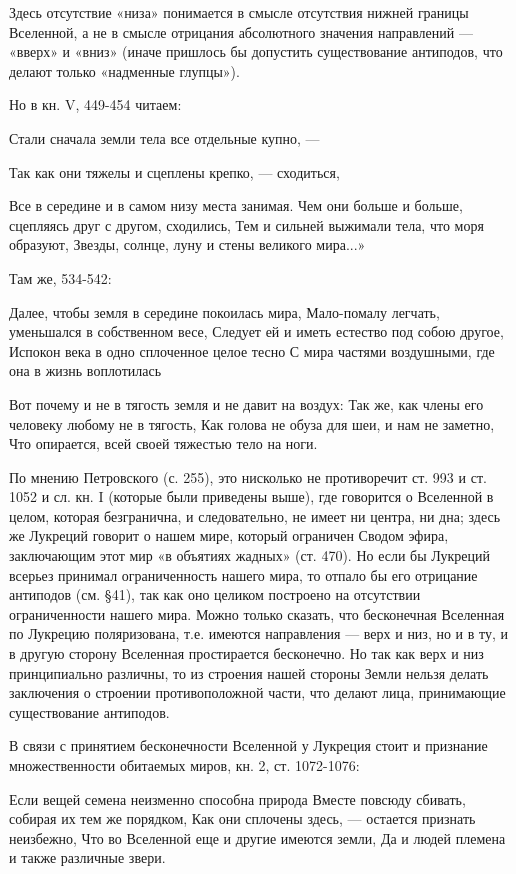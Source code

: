 Здесь отсутствие «низа» понимается в смысле отсутствия нижней границы
Вселенной, а не в смысле отрицания абсолютного значения направлений
--- «вверх» и «вниз» (иначе пришлось бы допустить существование
антиподов, что делают только «надменные глупцы»).

Но в кн. V, 449-454 читаем:

Стали сначала земли тела все отдельные купно, ---

Так как они тяжелы и сцеплены крепко, --- сходиться,

Все в середине и в самом низу места занимая. Чем они больше и больше,
сцепляясь друг с другом, сходились, Тем и сильней выжимали тела, что
моря образуют, Звезды, солнце, луну и стены великого мира...»

Там же, 534-542:

Далее, чтобы земля в середине покоилась мира, Мало-помалу легчать,
уменьшался в собственном весе, Следует ей и иметь естество под собою
другое, Испокон века в одно сплоченное целое тесно С мира частями
воздушными, где она в жизнь воплотилась

Вот почему и не в тягость земля и не давит на воздух: Так же, как
члены его человеку любому не в тягость, Как голова не обуза для шеи, и
нам не заметно, Что опирается, всей своей тяжестью тело на ноги.

По мнению Петровского (с. 255), это нисколько не противоречит ст. 993
и ст. 1052 и сл. кн. I (которые были приведены выше), где говорится о
Вселенной в целом, которая безгранична, и следовательно, не имеет ни
центра, ни дна; здесь же Лукреций говорит о нашем мире, который
ограничен Сводом эфира, заключающим этот мир «в объятиях жадных» (ст.
470). Но если бы Лукреций всерьез принимал ограниченность нашего мира,
то отпало бы его отрицание антиподов (см. §41), так как оно целиком
построено на отсутствии ограниченности нашего мира. Можно только
сказать, что бесконечная Вселенная по Лукрецию поляризована, т.е.
имеются направления --- верх и низ, но и в ту, и в другую сторону
Вселенная простирается бесконечно. Но так как верх и низ принципиально
различны, то из строения нашей стороны Земли нельзя делать заключения
о строении противоположной части, что делают лица, принимающие
существование антиподов.

В связи с принятием бесконечности Вселенной у Лукреция стоит и
признание множественности обитаемых миров, кн. 2, ст. 1072-1076:

Если вещей семена неизменно способна природа Вместе повсюду сбивать,
собирая их тем же порядком, Как они сплочены здесь, --- остается
признать неизбежно, Что во Вселенной еще и другие имеются земли, Да и
людей племена и также различные звери.

